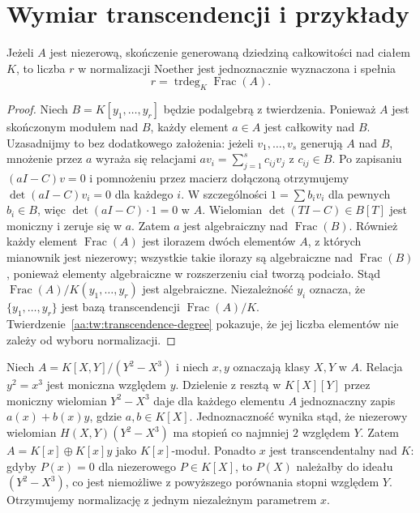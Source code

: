 \section{Wymiar transcendencji i przykłady}
\begin{wniosek}\label{aa:wn:noether-dimension}
Jeżeli $A$ jest niezerową, skończenie generowaną dziedziną
całkowitości nad ciałem $K$, to liczba $r$ w normalizacji
Noether jest jednoznacznie wyznaczona i spełnia
\[
 r=\operatorname{trdeg}_K\operatorname{Frac}(A).
\]
\end{wniosek}
\begin{proof}
Niech $B=K[y_1,\ldots,y_r]$ będzie podalgebrą z twierdzenia.
Ponieważ $A$ jest skończonym modułem nad $B$, każdy element
$a\in A$ jest całkowity nad $B$.
Uzasadnijmy to bez dodatkowego założenia: jeżeli
$v_1,\ldots,v_s$ generują $A$ nad $B$, mnożenie przez $a$
wyraża się relacjami
$a v_i=\sum_{j=1}^s c_{ij}v_j$ z $c_{ij}\in B$.
Po zapisaniu $(aI-C)v=0$ i pomnożeniu przez macierz
dołączoną otrzymujemy
$\det(aI-C)v_i=0$ dla każdego $i$.
W szczególności $1=\sum b_i v_i$ dla pewnych $b_i\in B$,
więc $\det(aI-C)\cdot1=0$ w $A$.
Wielomian $\det(TI-C)\in B[T]$ jest moniczny i zeruje się
w $a$. Zatem $a$ jest algebraiczny nad $\operatorname{Frac}(B)$.
Również każdy element $\operatorname{Frac}(A)$ jest ilorazem
dwóch elementów $A$, z których mianownik jest niezerowy;
wszystkie takie ilorazy są algebraiczne nad
$\operatorname{Frac}(B)$, ponieważ elementy algebraiczne
w rozszerzeniu ciał tworzą podciało.
Stąd $\operatorname{Frac}(A)/K(y_1,\ldots,y_r)$ jest
algebraiczne. Niezależność $y_i$ oznacza, że
$\{y_1,\ldots,y_r\}$ jest bazą transcendencji
$\operatorname{Frac}(A)/K$.
Twierdzenie~\ref{aa:tw:transcendence-degree} pokazuje,
że jej liczba elementów nie zależy od wyboru normalizacji.
\end{proof}

\begin{przyklad}
\label{aa:prz:noether-parabola}
Niech $A=K[X,Y]/(Y^2-X^3)$ i niech $x,y$ oznaczają klasy
$X,Y$ w $A$. Relacja $y^2=x^3$ jest moniczna względem $y$.
Dzielenie z resztą w $K[X][Y]$ przez moniczny wielomian
$Y^2-X^3$ daje dla każdego elementu $A$ jednoznaczny zapis
$a(x)+b(x)y$, gdzie $a,b\in K[X]$.
Jednoznaczność wynika stąd, że niezerowy wielomian
$H(X,Y)(Y^2-X^3)$ ma stopień co najmniej $2$ względem $Y$.
Zatem $A=K[x]\oplus K[x]y$ jako $K[x]$-moduł.
Ponadto $x$ jest transcendentalny nad $K$:
gdyby $P(x)=0$ dla niezerowego $P\in K[X]$, to
$P(X)$ należałby do ideału $(Y^2-X^3)$, co jest niemożliwe
z powyższego porównania stopni względem $Y$.
Otrzymujemy normalizację z jednym niezależnym parametrem $x$.
\end{przyklad}

